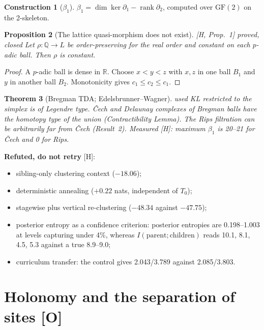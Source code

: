 \documentclass[11pt]{article}
\newtheorem{theorem}{Theorem}[section]
\newtheorem{proposition}[theorem]{Proposition}
\theoremstyle{definition}
\newtheorem{construction}[theorem]{Construction}
\theoremstyle{remark}
\newcommand{\Q}{\mathbb{Q}}
\newcommand{\R}{\mathbb{R}}
\newcommand{\src}[1]{\textsf{\small[#1]}}
\newcommand{\st}[1]{\textsf{\small\color{gray}#1}}
\begin{document}
\begin{construction}[$\beta_1$] $\beta_1=\dim\ker\partial_1-\operatorname{rank}\partial_2$, computed over $\mathrm{GF}(2)$ on the 2-skeleton.\end{construction}
\begin{proposition}[The lattice quasi-morphism does not exist]\label{prop:padic}
\src{H, Prop.~1} \st{proved, closed}
Let $\rho:\Q\to L$ be order-preserving for the real order and constant on each $p$-adic ball. Then $\rho$ is constant.
\end{proposition}
\begin{proof}
A $p$-adic ball is dense in $\R$. Choose $x<y<z$ with $x,z$ in one ball $B_1$ and $y$ in another ball $B_2$. Monotonicity gives $c_1\le c_2\le c_1$.
\end{proof}
\begin{theorem}[Bregman TDA; Edelsbrunner--Wagner]\label{thm:ew}\st{used}
KL restricted to the simplex is of Legendre type. \v{C}ech and Delaunay complexes of Bregman balls have the homotopy type of the union (Contractibility Lemma). The Rips filtration can be arbitrarily far from \v{C}ech (Result~2). Measured \src{H}: maximum $\beta_1$ is 20--21 for \v{C}ech and 0 for Rips.
\end{theorem}

\noindent\textbf{Refuted, do not retry} \src{H}:
\begin{itemize}
  \item sibling-only clustering context ($-18.06$);
  \item deterministic annealing ($+0.22$ nats, independent of $T_0$);
  \item stagewise plus vertical re-clustering ($-48.34$ against $-47.75$);
  \item posterior entropy as a confidence criterion: posterior entropies are 0.198--1.003 at levels capturing under 4\%, whereas $I(\text{parent};\text{children})$ reads 10.1, 8.1, 4.5, 5.3 against a true 8.9--9.0;
  \item curriculum transfer: the control gives 2.043/3.789 against 2.085/3.803.
\end{itemize}

\part{Holonomy and the separation of sites \src{O}}
\end{document}
